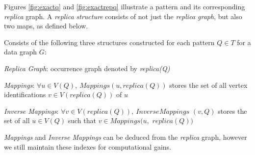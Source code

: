 Figures \ref{fig:exactq} and \ref{fig:exactrepq} illustrate a pattern and its
corresponding \emph{replica} graph. A \emph{replica structure} consists of not
just the \emph{replica graph}, but also two maps, as
defined below. 


 Consists of the following three
structures constructed for each pattern $Q\in T$ for a data graph $G$:

 \textit{Replica Graph}: occurrence
graph denoted by \textit{replica(Q)}

 \textit{Mappings}: $\forall u \in
V(Q),\ Mappings(u, replica(Q))$ stores the set of all vertex identifications
$v\in V(replica(Q))$ of $u$

 \textit{Inverse Mappings}: $\forall v \in
V(replica(Q)),\ InverseMappings$ $(v, Q)$ stores the set of all $u\in V(Q)$ such
that $v\in Mappings(u,$ $replica(Q))$

 \emph{Mappings} and \emph{Inverse
Mappings} can be deduced from the \emph{replica} graph, however we still maintain
these indexes for computational gains. 



